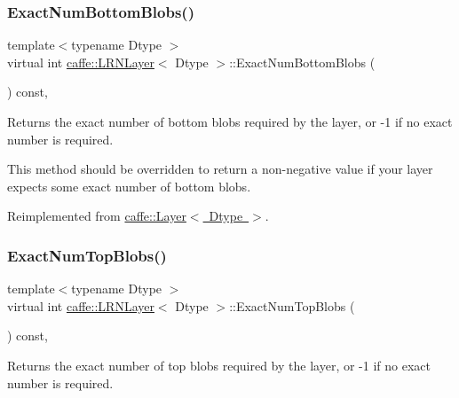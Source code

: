 \subsubsection{\texorpdfstring{Exact\+Num\+Bottom\+Blobs()}{ExactNumBottomBlobs()}\hspace{0.1cm}{\footnotesize\ttfamily [2/2]}}
{\footnotesize\ttfamily template$<$typename Dtype $>$ \\
virtual int \mbox{\hyperlink{classcaffe_1_1_l_r_n_layer}{caffe\+::\+L\+R\+N\+Layer}}$<$ Dtype $>$\+::Exact\+Num\+Bottom\+Blobs (\begin{DoxyParamCaption}{ }\end{DoxyParamCaption}) const\hspace{0.3cm}{\ttfamily [inline]}, {\ttfamily [virtual]}}



Returns the exact number of bottom blobs required by the layer, or -\/1 if no exact number is required. 

This method should be overridden to return a non-\/negative value if your layer expects some exact number of bottom blobs. 

Reimplemented from \mbox{\hyperlink{classcaffe_1_1_layer_a8e5ee0494d85f5f55fc4396537cbc60f}{caffe\+::\+Layer$<$ Dtype $>$}}.

\mbox{\label{classcaffe_1_1_l_r_n_layer_ac0ee88b119c38749c50e914521cdc148}} 
\subsubsection{\texorpdfstring{Exact\+Num\+Top\+Blobs()}{ExactNumTopBlobs()}\hspace{0.1cm}{\footnotesize\ttfamily [1/2]}}
{\footnotesize\ttfamily template$<$typename Dtype $>$ \\
virtual int \mbox{\hyperlink{classcaffe_1_1_l_r_n_layer}{caffe\+::\+L\+R\+N\+Layer}}$<$ Dtype $>$\+::Exact\+Num\+Top\+Blobs (\begin{DoxyParamCaption}{ }\end{DoxyParamCaption}) const\hspace{0.3cm}{\ttfamily [inline]}, {\ttfamily [virtual]}}



Returns the exact number of top blobs required by the layer, or -\/1 if no exact number is required. 

